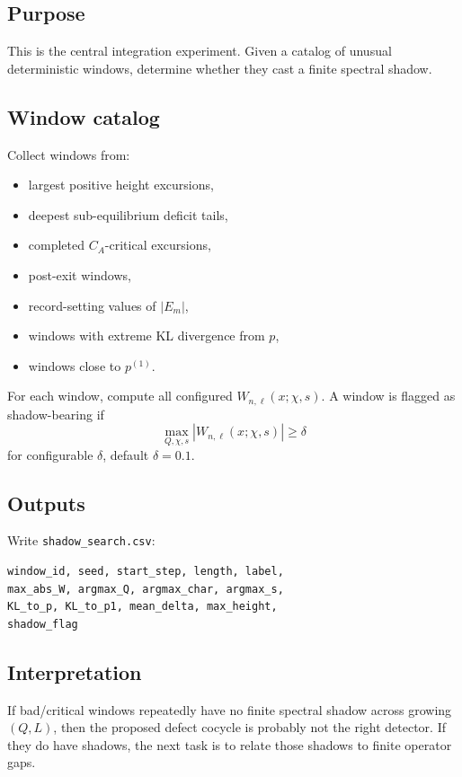 \documentclass[11pt]{article}
\begin{document}
\subsection{Purpose}

This is the central integration experiment.  Given a catalog of unusual deterministic windows, determine whether they cast a finite spectral shadow.

\subsection{Window catalog}

Collect windows from:
\begin{itemize}
\item largest positive height excursions,
\item deepest sub-equilibrium deficit tails,
\item completed \(C_A\)-critical excursions,
\item post-exit windows,
\item record-setting values of \(|E_m|\),
\item windows with extreme KL divergence from \(p\),
\item windows close to \(p^{(1)}\).
\end{itemize}

For each window, compute all configured \(W_{n,\ell}(x;\chi,s)\).  A window is flagged as shadow-bearing if
\[
        \max_{Q,\chi,s}|W_{n,\ell}(x;\chi,s)|\ge \delta
\]
for configurable \(\delta\), default \(\delta=0.1\).

\subsection{Outputs}

Write \texttt{shadow\_search.csv}:
\begin{lstlisting}
window_id, seed, start_step, length, label,
max_abs_W, argmax_Q, argmax_char, argmax_s,
KL_to_p, KL_to_p1, mean_delta, max_height,
shadow_flag
\end{lstlisting}

\subsection{Interpretation}

If bad/critical windows repeatedly have no finite spectral shadow across growing \((Q,L)\), then the proposed defect cocycle is probably not the right detector.  If they do have shadows, the next task is to relate those shadows to finite operator gaps.
\end{document}
